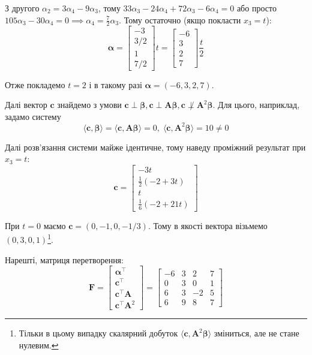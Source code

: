 \documentclass[oneside,solution]{karazin-control-assign}
\begin{document}
З другого $\alpha_2=3\alpha_4-9\alpha_3$, тому $33\alpha_3-24\alpha_4+72\alpha_3-6\alpha_4=0$ або просто $105\alpha_3-30\alpha_4=0 \implies \alpha_4 = \frac{7}{2}\alpha_3$. Тому остаточно (якщо покласти $x_3=t$):
\begin{equation}
    \boldsymbol{\alpha} = \begin{bmatrix}
        -3 \\ 3/2 \\ 1 \\ 7/2
    \end{bmatrix}t = \begin{bmatrix}
        -6 \\ 3 \\ 2 \\ 7
    \end{bmatrix}\frac{t}{2}
\end{equation}

Отже покладемо $t=2$ і в такому разі $\boldsymbol{\alpha} = (-6,3,2,7)$. 

Далі вектор $\mathbf{c}$ знайдемо з умови $\mathbf{c} \perp \boldsymbol{\beta},\mathbf{c} \perp \boldsymbol{A}\boldsymbol{\beta},\mathbf{c} \not\perp \boldsymbol{A}^2\boldsymbol{\beta}$. Для цього, наприклад, задамо систему
\begin{equation}
    \langle \mathbf{c}, \boldsymbol{\beta} \rangle = \langle \mathbf{c}, \boldsymbol{A}\boldsymbol{\beta} \rangle = 0, \; \langle \mathbf{c}, \boldsymbol{A}^2\boldsymbol{\beta} \rangle = 10 \neq 0
\end{equation}

Далі розв'язання системи майже ідентичне, тому наведу проміжний результат при $x_3=t$:
\begin{equation}
    \mathbf{c} = \begin{bmatrix}
        -3t \\ \frac{1}{2}(-2+3t) \\ t \\ \frac{1}{6}(-2+21t)
    \end{bmatrix}
\end{equation}

При $t=0$ маємо $\mathbf{c} = (0,-1,0,-1/3)$. Тому в якості вектора візьмемо $(0,3,0,1)$\footnote{Тільки в цьому випадку скалярний добуток $\langle \mathbf{c},\boldsymbol{A}^2\boldsymbol{\beta}\rangle$ зміниться, але не стане нулевим.}.

Нарешті, матриця перетворення:
\begin{equation}
    \boldsymbol{F} = \begin{bmatrix}
        \boldsymbol{\alpha}^{\top} \\
        \mathbf{c}^{\top} \\
        \mathbf{c}^{\top}\boldsymbol{A} \\
        \mathbf{c}^{\top}\boldsymbol{A}^2
    \end{bmatrix} = \begin{bmatrix}
        -6 & 3 & 2 & 7 \\
        0 & 3 & 0 & 1 \\
        6 & 3 & -2 & 5 \\
        6 & 9 & 8 & 7
    \end{bmatrix}
\end{equation}
\end{document}
